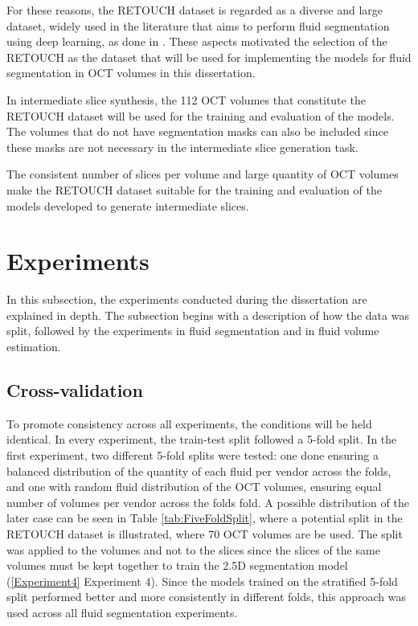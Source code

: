 \par
For these reasons, the RETOUCH dataset is regarded as a diverse and large dataset, widely used in the literature that aims to perform fluid segmentation using deep learning, as done in \parencite{Rahil2023, Zhang2023, Xing2022, Tang2022, Liu2024, Li2023, Hassan2021b, Lu2019}. These aspects motivated the selection of the RETOUCH as the dataset that will be used for implementing the models for fluid segmentation in OCT volumes in this dissertation.
\par
In intermediate slice synthesis, the 112 OCT volumes that constitute the RETOUCH dataset will be used for the training and evaluation of the models. The volumes that do not have segmentation masks can also be included since these masks are not necessary in the intermediate slice generation task.
\par
The consistent number of slices per volume and large quantity of OCT volumes make the RETOUCH dataset suitable for the training and evaluation of the models developed to generate intermediate slices.

\section{Experiments}\label{Experiments}
In this subsection, the experiments conducted during the dissertation are explained in depth. The subsection begins with a description of how the data was split, followed by the experiments in fluid segmentation and in fluid volume estimation.

\subsection{Cross-validation}
To promote consistency across all experiments, the conditions will be held identical. In every experiment, the train-test split followed a 5-fold split. In the first experiment, two different 5-fold splits were tested: one done ensuring a balanced distribution of the quantity of each fluid per vendor across the folds, and one with random fluid distribution of the OCT volumes, ensuring equal number of volumes per vendor across the folds fold. A possible distribution of the later case can be seen in Table \ref{tab:FiveFoldSplit}, where a potential split in the RETOUCH dataset is illustrated, where 70 OCT volumes are be used. The split was applied to the volumes and not to the slices since the slices of the same volumes must be kept together to train the 2.5D segmentation model (\ref{Experiment4} Experiment 4). Since the models trained on the stratified 5-fold split performed better and more consistently in different folds, this approach was used across all fluid segmentation experiments.

